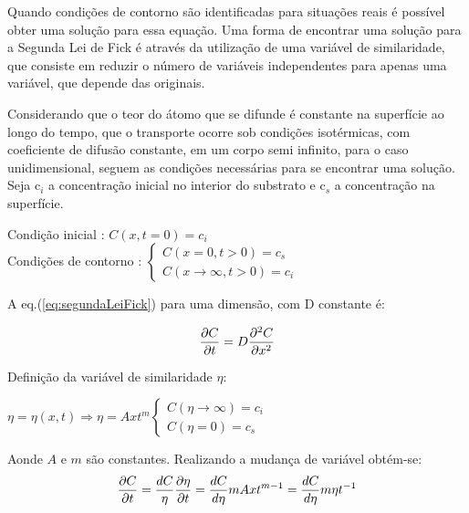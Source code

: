 \documentclass[]{politex}
\begin{document}
	Quando condições de contorno são identificadas para situações reais é possível obter uma solução para essa equação. Uma forma de encontrar uma solução para a Segunda Lei de Fick é através da utilização de uma variável de similaridade, que consiste em reduzir o número de variáveis independentes para apenas uma variável, que depende das originais. \par
	Considerando que o teor do átomo que se difunde é constante na superfície ao longo do tempo, que o transporte ocorre sob condições isotérmicas, com coeficiente de difusão constante, em um corpo semi infinito, para o caso unidimensional, seguem as condições necessárias para se encontrar uma solução. Seja c$_i$ a concentração inicial no interior do substrato e c$_s$ a concentração na superfície.\par
\begin{center} 
	Condição inicial : $C(x,t=0) = c_i$ \\
	Condições de contorno : 
	\begin{math}
  		\left\{
    	\begin{array}{l}
      		C(x=0,t>0) = c_s\\
      		C(x\rightarrow \infty, t>0) = c_i
    	\end{array}
  		\right.
	\end{math}
\end{center}

A eq.(\ref{eq:segundaLeiFick}) para uma dimensão, com D constante é:

\begin{equation} \label{eq:segundaLeiFickUmD}
 \pdv{C}{t} = D\pdv[2]{C}{x}
\end{equation}

Definição da variável de similaridade $\eta$:

\begin{center}
	\begin{math}
		\eta = \eta(x,t) \Rightarrow \eta = Axt^m
		\left\{
    		\begin{array}{l}
      			C(\eta\rightarrow \infty) = c_i\\
      			C(\eta=0) = c_s
    		\end{array}
		\right.
	\end{math}
\end{center}

Aonde $A$ e $m$ são constantes.
Realizando a mudança de variável obtém-se:
\begin{equation} \label{eq:solA}
 \pdv{C}{t} = \frac{dC}{\eta}\pdv{\eta}{t} = \frac{dC}{d\eta}mAxt^{m-1} = \frac{dC}{d\eta}m\eta t^{-1}
\end{equation}
\end{document}
